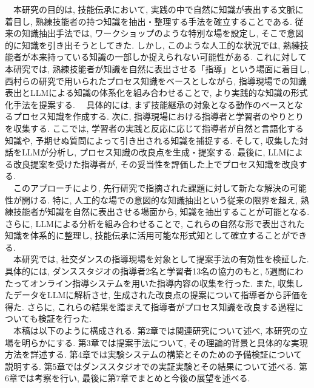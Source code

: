 　本研究の目的は, 技能伝承において, 実践の中で自然に知識が表出する文脈に着目し, 熟練技能者の持つ知識を抽出・整理する手法を確立することである. 従来の知識抽出手法では, ワークショップのような特別な場を設定し, そこで意図的に知識を引き出そうとしてきた. しかし, このような人工的な状況では, 熟練技能者が本来持っている知識の一部しか捉えられない可能性がある. これに対して本研究では, 熟練技能者が知識を自然に表出させる「指導」という場面に着目し, 西村らの研究\cite{Nishimura2017}で用いられたプロセス知識をベースとしながら, 指導現場での知識表出とLLMによる知識の体系化を組み合わせることで, より実践的な知識の形式化手法を提案する. 
　具体的には, まず技能継承の対象となる動作のベースとなるプロセス知識を作成する. 次に, 指導現場における指導者と学習者のやりとりを収集する. ここでは, 学習者の実践と反応に応じて指導者が自然と言語化する知識や, 予期せぬ質問によって引き出される知識を捕捉する. そして, 収集した対話をLLMが分析し, プロセス知識の改良点を生成・提案する. 最後に, LLMによる改良提案を受けた指導者が, その妥当性を評価した上でプロセス知識を改良する. \\
　このアプローチにより, 先行研究で指摘された課題に対して新たな解決の可能性が開ける. 特に, 人工的な場での意図的な知識抽出という従来の限界を超え, 熟練技能者が知識を自然に表出させる場面から, 知識を抽出することが可能となる. さらに, LLMによる分析を組み合わせることで, これらの自然な形で表出された知識を体系的に整理し, 技能伝承に活用可能な形式知として確立することができる. \\
　本研究では, 社交ダンスの指導現場を対象として提案手法の有効性を検証した. 具体的には, ダンススタジオの指導者2名と学習者13名の協力のもと, 5週間にわたってオンライン指導システムを用いた指導内容の収集を行った. また, 収集したデータをLLMに解析させ, 生成された改良点の提案について指導者から評価を得た. さらに, これらの結果を踏まえて指導者がプロセス知識を改良する過程についても検証を行った.\\
　本稿は以下のように構成される. 第2章では関連研究について述べ, 本研究の立場を明らかにする. 第3章では提案手法について, その理論的背景と具体的な実現方法を詳述する. 第4章では実験システムの構築とそのための予備検証について説明する. 第5章ではダンススタジオでの実証実験とその結果について述べる. 第6章では考察を行い, 最後に第7章でまとめと今後の展望を述べる.\\



